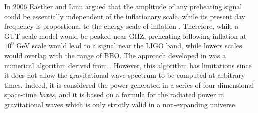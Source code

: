 \documentclass[11pt,a4paper,twoside]{book}
\begin{document}
In 2006 Easther and Linn argued that the amplitude  of any preheating signal could be essentially independent of the inflationary scale, while its present day frequency is proportional to the energy scale of inflation \cite{Chap7:BoxMethod}. Therefore, while a GUT scale model would be peaked near GHZ, preheating following inflation at $ 10^{9} $ GeV scale would lead to a signal near the LIGO band, while lowers scales would overlap with the range of BBO. The approach developed in \cite{Chap7:BoxMethod} was a numerical algorithm derived from \cite{Chap7:WeinbergBoxMethod}. However, this algorithm has limitations since it does not allow the gravitational wave spectrum to be computed at arbitrary times. Indeed, it is considered the power generated in a series of four dimensional space-time \textit{boxes}, and it is based on a formula for the radiated power in gravitational waves which is only strictly valid in a non-expanding universe.
\end{document}
